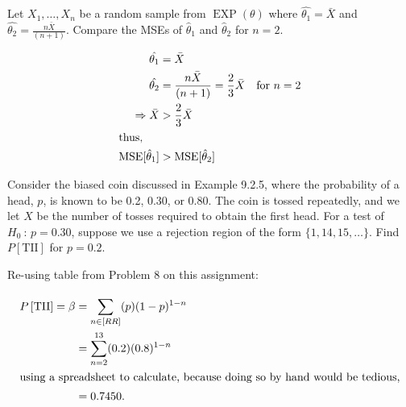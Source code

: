 \documentclass[answers]{exam}
\begin{document}
\begin{questions}
\question 
Let \(X_1,\ldots,X_n\) be a random sample from \(\operatorname{EXP}(\theta)\) where \(\hat{\theta_1}=\bar{X}\) and \(\hat{\theta_2}=\frac{n\bar{X}}{(n+1)}\). 
Compare the MSEs of \(\hat{\theta}_1\) and \(\hat{\theta}_2\) for \(n=2\).
\begin{solution}
	\begin{align*}
		\hat{\theta_1} &= \bar{X} \\
		\hat{\theta_2} & = \frac{n\bar{X}}{(n+1)} 
		= \frac{2}{3}\bar{X} \quad \text{for } n=2 \\
		\Rightarrow \bar{X} &> \frac{2}{3}\bar{X} \\
		\intertext{thus,}
		\text{MSE}[\hat{\theta}_1] &> \text{MSE}[\hat{\theta}_2]
	\end{align*}
	
	
\end{solution}

\question 
Consider the biased coin discussed in Example 9.2.5, where the probability of a
head, \(p\), is known to be 0.2, 0.30, or 0.80. 
The coin is tossed repeatedly, and we let \(X\) be the number of tosses 
required to obtain the first head. For a test of \(H_0\ :\,p=0.30\), 
suppose we use a rejection region of the form \(\{1,14,15,\ldots\}\). 
Find \(P\left[\text{TII}\right]\) for \(p=0.2\).
\begin{solution}
	Re-using table from Problem 8 on this assignment:
	
	\begin{align*}
		P\left[\text{TII}\right]=\beta&=\sum_{n\in[RR]}^{}(p)(1-p)^{1-n} \\
		&=\sum_{n=2}^{13}(0.2)(0.8)^{1-n} \\
		\intertext{using a spreadsheet to calculate, because doing so by hand would be tedious,}
		&= 0.7450.
	\end{align*}
\end{solution}

\end{questions}
\end{document}
